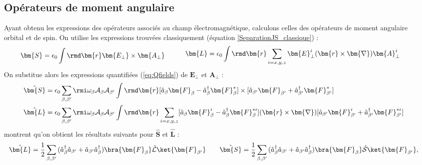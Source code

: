 \subsection{Opérateurs de moment angulaire}
Ayant obtenu les expressions des opérateurs associés au champ électromagnétique, calculons celles des opérateurs de moment angulaire orbital et de spin. On utilise les expressions trouvées classiquement (équation \ref{SeparationJS_classique}) : 
\begin{equation}
\begin{aligned}[c]
\bm{S}&=\epsilon_0\int{\rmd\bm{r}\bm{E_{\bot}}\times\bm{A_{\bot}}}
\end{aligned}
\qquad
\begin{aligned}[c]
\bm{L}&=\epsilon_0\int{\rmd\bm{r}\sum_{i=x,y,z} \bm{E}^i_{\bot}(\bm{r}\times\bm{\nabla})\bm{A}^i_{\bot}}
\end{aligned}
\end{equation} 
On substitue alors les expressions quantifiées (\ref{eq:Qfields}) de $\bm{E_{\bot}}$ et $\bm{A_{\bot}}$ :
\begin{align}
\hat{\bm{S}}&= \epsilon_0 \sum_{\beta,\beta '} \rmi \omega_{\beta}\mathcal{A}_{\beta}\mathcal{A}_{\beta '}\int{\rmd\bm{r}
[\hat{a}_{\beta}\bm{F}_{\beta}-\hat{a}^{\dag}_{\beta}\bm{F}^*_{\beta}]\times[\hat{a}_{\beta '}\bm{F}_{\beta '}+\hat{a}^{\dag}_{\beta '}\bm{F}^*_{\beta '}}]\\
\hat{\bm{L}}&= \epsilon_0 \sum_{\beta,\beta '} \rmi \omega_{\beta}\mathcal{A}_{\beta}\mathcal{A}_{\beta '}\int{\rmd\bm{r}
\sum_{i=x,y,z}[\hat{a}_{\beta}\bm{F}^i_{\beta}-\hat{a}^{\dag}_{\beta}\bm{F}^{*i}_{\beta}](\bm{r}\times\bm{\nabla})[\hat{a}_{\beta '}\bm{F}^i_{\beta '}+\hat{a}^{\dag}_{\beta '}\bm{F}^{*i}_{\beta '}}]
\end{align}
 montrent qu'on obtient les résultats suivants pour $\hat{\bm{S}}$ et $\hat{\bm{L}}$ :
\begin{equation}
\begin{aligned}[c]
\hat{\bm{L}}=\frac{1}{2}\sum_{\beta,\beta'}{(\hat{a}^{\dag}_{\beta}\hat{a}_{\beta'}+\hat{a}_{\beta'}\hat{a}^{\dag}_{\beta})}\bra{\bm{F}_\beta}\hat{\mathcal{L}}\ket{\bm{F}_{\beta'}}
\end{aligned}
\qquad
\begin{aligned}[c]
\hat{\bm{S}}=\frac{1}{2}\sum_{\beta,\beta'}{(\hat{a}^{\dag}_{\beta}\hat{a}_{\beta'}+\hat{a}_{\beta'}\hat{a}^{\dag}_{\beta})}\bra{\bm{F}_\beta}\hat{\mathcal{S}}\ket{\bm{F}_{\beta'}},
\end{aligned}
\label{eqLS_QED}
\end{equation}
